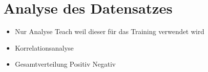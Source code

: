 \section{Analyse des Datensatzes}\label{sec:analyse}
\begin{itemize}
    \item Nur Analyse Teach weil dieser für das Training verwendet wird
    \item Korrelationsanalyse
    \item Gesamtverteilung Positiv Negativ 
\end{itemize}